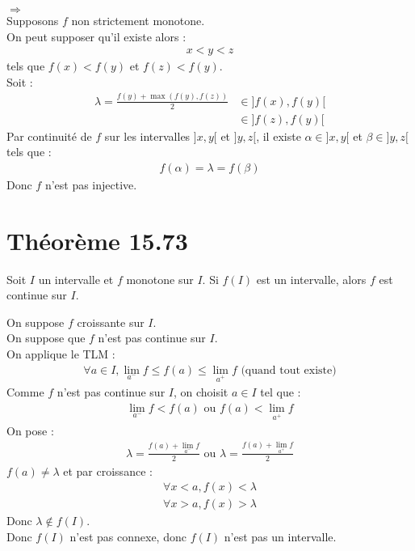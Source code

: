 \documentclass[../main.tex]{subfiles}
\begin{document}
$\boxed{\Rightarrow}$ \\
Supposons $f$ non strictement monotone. \\
On peut supposer qu'il existe alors : 
\begin{align*}
    x < y < z
\end{align*}
tels que $f(x) < f(y)$ et $f(z) < f(y)$. \\
Soit :
\begin{align*}
    \lambda = \frac{f(y) + \max(f(y), f(z))}{2} &\in ]f(x), f(y)[ \\
    &\in ]f(z), f(y)[
\end{align*}
Par continuité de $f$ sur les intervalles $]x, y[$ et $]y, z[$, il existe $\alpha \in ]x, y[$ et $\beta \in ]y, z[$ tels que : 
\begin{align*}
    f(\alpha) = \lambda = f(\beta)
\end{align*}
Donc $f$ n'est pas injective. 

\section{Théorème 15.73}
\begin{tcolorbox}[title=Théorème 15.73, title filled=false, colframe=orange, colback=orange!10!white]
    Soit $I$ un intervalle et $f$ monotone sur $I$. Si $f(I)$ est un intervalle, alors $f$ est continue sur $I$. 
\end{tcolorbox}

\noindent On suppose $f$ croissante sur $I$. \\
On suppose que $f$ n'est pas continue sur $I$. \\
On applique le TLM : 
\begin{align*}
    \forall a \in I, \lim_{a^-} f \leq f(a) \leq \lim_{a^+} f \text{ (quand tout existe)}
\end{align*}
Comme $f$ n'est pas continue sur $I$, on choisit $a \in I$ tel que : 
\begin{align*}
    \lim_{a^-} f < f(a) \text{ ou } f(a) < \lim_{a^+} f
\end{align*}
On pose :
\begin{align*}
    \lambda = \frac{f(a) + \lim_{a^-} f}{2} \text{ ou } \lambda = \frac{f(a) + \lim_{a^+} f}{2}
\end{align*}
$f(a) \neq \lambda$ et par croissance : 
\begin{align*}
    \forall x < a, f(x) < \lambda \\
    \forall x > a, f(x) > \lambda
\end{align*}
Donc $\lambda \not\in f(I)$. \\
Donc $f(I)$ n'est pas connexe, donc $f(I)$ n'est pas un intervalle. 
\end{document}
